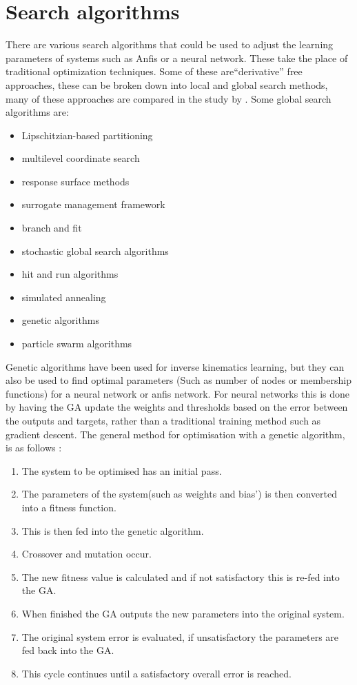 \documentclass[a4paper,11pt]{article}
\begin{document}
\section{Search algorithms}
There are various search algorithms that could be used to adjust the learning parameters of systems such as Anfis or a neural network. These take the place of traditional optimization techniques. Some of these are``derivative'' free approaches, these can be broken down into local and global search methods, many of these approaches are compared in the study by \cite{searchpaper}.
\newline
\newline
Some global search algorithms are\citep{searchpaper}:

\begin{itemize}
  \item Lipschitzian-based partitioning
  \item multilevel coordinate search
  \item response surface methods
  \item surrogate management framework
  \item branch and fit
  \item stochastic global search algorithms
  \item hit and run algorithms
  \item simulated annealing
  \item genetic algorithms
  \item particle swarm algorithms
\end{itemize}
Genetic algorithms have been used for inverse kinematics learning, but they can also be used to find optimal parameters (Such as number of nodes or membership functions) for a neural network or anfis network.
For neural networks this is done by having the GA update the weights and thresholds based on the error between the outputs and targets, rather than a traditional training method such as gradient descent.
\newline
\newline
The general method for optimisation with a genetic algorithm, is as follows \citep{bpannGa}:
\begin{enumerate}
  \item The system to be optimised has an initial pass.
  \item The parameters of the system(such as weights and bias') is then converted into a fitness function.
  \item This is then fed into the genetic algorithm.
  \item Crossover and mutation occur.
  \item The new fitness value is calculated and if not satisfactory this is re-fed into the GA.
  \item When finished the GA outputs the new parameters into the original system.
  \item The original system error is evaluated, if unsatisfactory the parameters are fed back into the GA.
  \item This cycle continues until a satisfactory overall error is reached.
\end{enumerate}
\end{document}
